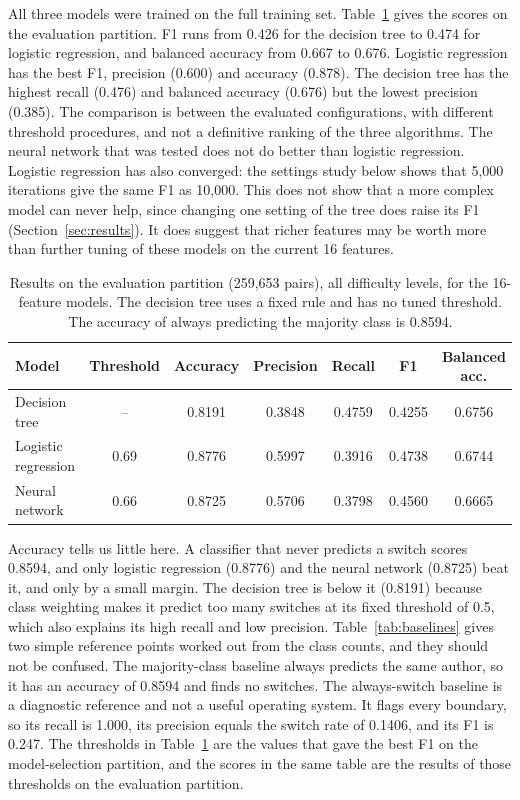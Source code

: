 \documentclass[runningheads]{llncs}
\newcommand{\tablefont}{\scriptsize\setlength{\tabcolsep}{3pt}}
\begin{document}
All three models were trained on the full training set. Table~\ref{tab:overall} gives the scores on the evaluation partition. F1 runs from 0.426 for the decision tree to 0.474 for logistic regression, and balanced accuracy from 0.667 to 0.676. Logistic regression has the best F1, precision (0.600) and accuracy (0.878). The decision tree has the highest recall (0.476) and balanced accuracy (0.676) but the lowest precision (0.385). The comparison is between the evaluated configurations, with different threshold procedures, and not a definitive ranking of the three algorithms. The neural network that was tested does not do better than logistic regression. Logistic regression has also converged: the settings study below shows that 5,000 iterations give the same F1 as 10,000. This does not show that a more complex model can never help, since changing one setting of the tree does raise its F1 (Section~\ref{sec:results}). It does suggest that richer features may be worth more than further tuning of these models on the current 16 features.

\begin{table}[t]
\centering
\caption{Results on the evaluation partition (259,653 pairs), all difficulty levels, for the 16-feature models. The decision tree uses a fixed rule and has no tuned threshold. The accuracy of always predicting the majority class is 0.8594.}
\label{tab:overall}
\tablefont
\begin{tabular}{lcccccc}
\toprule
\textbf{Model} & \textbf{Threshold} & \textbf{Accuracy} & \textbf{Precision} & \textbf{Recall} & \textbf{F1} & \textbf{Balanced acc.} \\
\midrule
Decision tree       & --   & 0.8191 & 0.3848 & 0.4759 & 0.4255 & 0.6756 \\
Logistic regression & 0.69 & 0.8776 & 0.5997 & 0.3916 & 0.4738 & 0.6744 \\
Neural network      & 0.66 & 0.8725 & 0.5706 & 0.3798 & 0.4560 & 0.6665 \\
\bottomrule
\end{tabular}
\end{table}

Accuracy tells us little here. A classifier that never predicts a switch scores 0.8594, and only logistic regression (0.8776) and the neural network (0.8725) beat it, and only by a small margin. The decision tree is below it (0.8191) because class weighting makes it predict too many switches at its fixed threshold of 0.5, which also explains its high recall and low precision. Table~\ref{tab:baselines} gives two simple reference points worked out from the class counts, and they should not be confused. The majority-class baseline always predicts the same author, so it has an accuracy of 0.8594 and finds no switches. The always-switch baseline is a diagnostic reference and not a useful operating system. It flags every boundary, so its recall is 1.000, its precision equals the switch rate of 0.1406, and its F1 is 0.247. The thresholds in Table~\ref{tab:overall} are the values that gave the best F1 on the model-selection partition, and the scores in the same table are the results of those thresholds on the evaluation partition.
\end{document}
